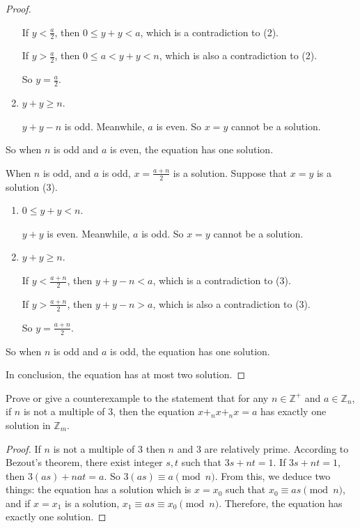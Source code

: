 \begin{proof}
\begin{enumerate}[label={\textbf{Case \arabic*}},itemindent=1cm]
              If $y < \frac{a}{2}$, then $0\le y + y < a$, which is a contradiction to (2).

              If $y > \frac{a}{2}$, then $0\le a < y + y < n$, which is also a contradiction to (2).

              So $y = \frac{a}{2}$.
        \item $y + y\ge n$.

              $y + y - n$ is odd. Meanwhile, $a$ is even. So $x = y$ cannot be a solution.
    \end{enumerate}

    So when $n$ is odd and $a$ is even, the equation has one solution.

    When $n$ is odd, and $a$ is odd, $x = \frac{a+n}{2}$ is a solution. Suppose that $x = y$ is a solution (3).
    \begin{enumerate}[label={\textbf{Case \arabic*}},itemindent=1cm]
        \item $0\le y + y < n$.

              $y + y$ is even. Meanwhile, $a$ is odd. So $x = y$ cannot be a solution.

        \item $y + y\ge n$.

              If $y < \frac{a+n}{2}$, then $y + y - n < a$, which is a contradiction to (3).

              If $y > \frac{a+n}{2}$, then $y + y - n > a$, which is also a contradiction to (3).

              So $y = \frac{a+n}{2}$.
    \end{enumerate}

    So when $n$ is odd and $a$ is odd, the equation has one solution.

    In conclusion, the equation has at most two solution.
\end{proof}

\begin{exercise}
    Prove or give a counterexample to the statement that for any $n\in\mathbb{Z}^{+}$ and $a\in\mathbb{Z}_{n}$, if $n$ is not a multiple of $3$, then the equation $x {+}_{n} x {+}_{n} x = a$ has exactly one solution in $\mathbb{Z}_{m}$.
\end{exercise}

\begin{proof}
    If $n$ is not a multiple of $3$ then $n$ and $3$ are relatively prime. According to Bezout's theorem, there exist integer $s, t$ such that $3s + nt = 1$. If $3s + nt = 1$, then $3(as) + nat = a$. So $3(as)\equiv a\pmod{n}$. From this, we deduce two things: the equation has a solution which is $x = x_{0}$ such that $x_{0}\equiv as\pmod{n}$, and if $x = x_{1}$ is a solution, $x_{1}\equiv as \equiv x_{0} \pmod{n}$. Therefore, the equation has exactly one solution.
\end{proof}

